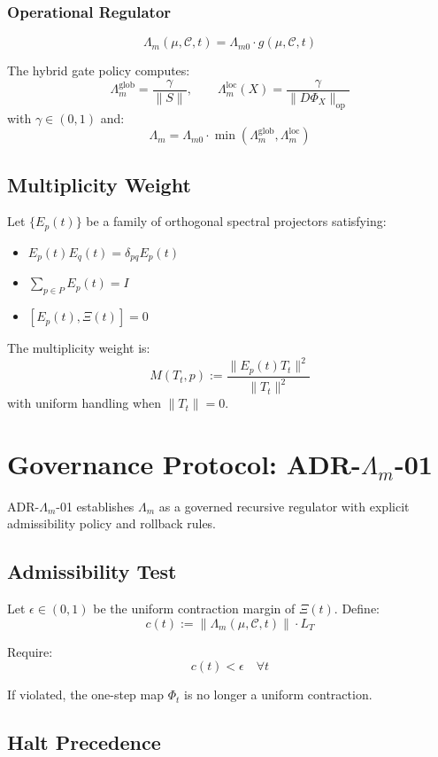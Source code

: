 \documentclass[11pt]{article}
\begin{document}
\subsubsection{Operational Regulator}
\[
\Lambda_m(\mu, \mathcal{C}, t) = \Lambda_{m0} \cdot g(\mu, \mathcal{C}, t)
\]

The hybrid gate policy computes:
\[
\Lambda_m^{\text{glob}} = \frac{\gamma}{\|S\|}, \qquad
\Lambda_m^{\text{loc}}(X) = \frac{\gamma}{\| D\Phi_X \|_{\mathrm{op}}}
\]
with $\gamma \in (0,1)$ and:
\[
\Lambda_m = \Lambda_{m0} \cdot \min(\Lambda_m^{\text{glob}}, \Lambda_m^{\text{loc}})
\]

\subsection{Multiplicity Weight}

Let $\{E_p(t)\}$ be a family of orthogonal spectral projectors satisfying:
\begin{itemize}
\item $E_p(t) E_q(t) = \delta_{pq} E_p(t)$
\item $\sum_{p \in P} E_p(t) = I$
\item $[E_p(t), \Xi(t)] = 0$
\end{itemize}

The multiplicity weight is:
\[
M(T_t, p) := \frac{\| E_p(t) T_t \|^2}{\| T_t \|^2}
\]
with uniform handling when $\|T_t\| = 0$.

\section{Governance Protocol: ADR-$\Lambda_m$-01}

ADR-$\Lambda_m$-01 establishes $\Lambda_m$ as a governed recursive regulator with explicit admissibility policy and rollback rules.

\subsection{Admissibility Test}

Let $\epsilon \in (0,1)$ be the uniform contraction margin of $\Xi(t)$. Define:
\[
c(t) := \|\Lambda_m(\mu, \mathcal{C}, t)\| \cdot L_T
\]

Require:
\[
c(t) < \epsilon \quad \forall t
\]

If violated, the one-step map $\Phi_t$ is no longer a uniform contraction.

\subsection{Halt Precedence}
\end{document}
